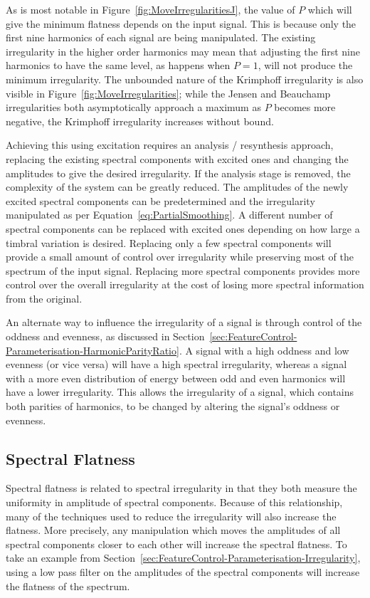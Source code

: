 		As is most notable in Figure~\ref{fig:MoveIrregularitiesJ}, the value of $P$ which will give the minimum
		flatness depends on the input signal. This is because only the first nine harmonics of each signal are
		being manipulated. The existing irregularity in the higher order harmonics may mean that adjusting the
		first nine harmonics to have the same level, as happens when $P = 1$, will not produce the minimum
		irregularity. The unbounded nature of the Krimphoff irregularity is also visible in
		Figure~\ref{fig:MoveIrregularities}; while the Jensen and Beauchamp irregularities both asymptotically
		approach a maximum as $P$ becomes more negative, the Krimphoff irregularity increases without bound.

		Achieving this using excitation requires an analysis / resynthesis approach, replacing the existing
		spectral components with excited ones and changing the amplitudes to give the desired irregularity. If the
		analysis stage is removed, the complexity of the system can be greatly reduced. The amplitudes of the newly
		excited spectral components can be predetermined and the irregularity manipulated as per
		Equation~\ref{eq:PartialSmoothing}. A different number of spectral components can be replaced with excited
		ones depending on how large a timbral variation is desired. Replacing only a few spectral components will
		provide a small amount of control over irregularity while preserving most of the spectrum of the input
		signal. Replacing more spectral components provides more control over the overall irregularity at the cost
		of losing more spectral information from the original.

		An alternate way to influence the irregularity of a signal is through control of the oddness and evenness,
		as discussed in Section~\ref{sec:FeatureControl-Parameterisation-HarmonicParityRatio}. A signal with a high
		oddness and low evenness (or vice versa) will have a high spectral irregularity, whereas a signal with a
		more even distribution of energy between odd and even harmonics will have a lower irregularity. This allows
		the irregularity of a signal, which contains both parities of harmonics, to be changed by altering the
		signal's oddness or evenness.

	\subsection{Spectral Flatness}
	\label{sec:FeatureControl-Parameterisation-Flatness}
		Spectral flatness is related to spectral irregularity in that they both measure the uniformity in amplitude
		of spectral components. Because of this relationship, many of the techniques used to reduce the
		irregularity will also increase the flatness. More precisely, any manipulation which moves the amplitudes
		of all spectral components closer to each other will increase the spectral flatness. To take an example
		from Section~\ref{sec:FeatureControl-Parameterisation-Irregularity}, using a low pass filter on the
		amplitudes of the spectral components will increase the flatness of the spectrum. 
		
